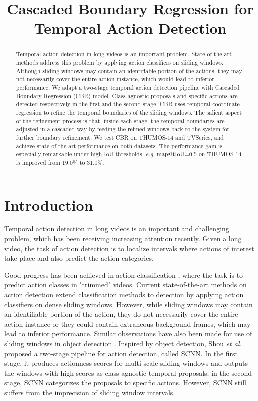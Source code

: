 \documentclass{bmvc2k}
\title{Cascaded Boundary Regression for Temporal Action Detection}
\begin{document}
\maketitle

\begin{abstract}
Temporal action detection in long videos is an important problem. State-of-the-art methods address this problem by applying action classifiers on sliding windows. Although sliding windows may contain an identifiable portion of the actions, they may not necessarily cover the entire action instance, which would lead to inferior performance. We adapt a two-stage temporal action detection pipeline with Cascaded Boundary Regression (CBR) model. Class-agnostic proposals and specific actions are detected respectively in the first and the second stage. CBR uses temporal coordinate regression to refine the temporal boundaries of the sliding windows. The salient aspect of the refinement process is that, inside each stage, the temporal boundaries are adjusted in a cascaded way by feeding the refined windows back to the system for further boundary refinement. We test CBR on THUMOS-14 and TVSeries, and achieve state-of-the-art performance on both datasets. The performance gain is especially remarkable under high IoU thresholds, \emph{e.g.} map@tIoU=0.5 on THUMOS-14 is improved from 19.0\% to 31.0\%.

\end{abstract}

\section{Introduction}
\label{sec:intro}
Temporal action detection in long videos is an important and challenging problem, which has been receiving increasing attention recently. Given a long video, the task of action detection is to localize intervals where actions of interest take place and also predict the action categories.

Good progress has been achieved in action classification \cite{simonyan2014two, tran2015learning}, where the task is to predict action classes in "trimmed" videos. Current state-of-the-art methods \cite{oneata2014lear, Yuan_2016_CVPR, Shou_2016_CVPR} on action detection extend classification methods to detection by applying action classifiers on dense sliding windows. However, while sliding windows may contain an identifiable portion of the action, they do not necessarily cover the entire action instance or they could contain extraneous background frames, which may lead to inferior performance. Similar observations have also been made for use of sliding windows in object detection \cite{sermanet2013overfeat}. Inspired by object detection, Shou \emph{et al.} \cite{Shou_2016_CVPR} proposed a two-stage pipeline for action detection, called SCNN. In the first stage, it produces actionness scores for multi-scale sliding windows and outputs the windows with high scores as class-agnostic temporal proposals; in the second stage, SCNN categorizes the proposals to specific actions. However, SCNN still suffers from the imprecision of sliding window intervals.   
\end{document}
